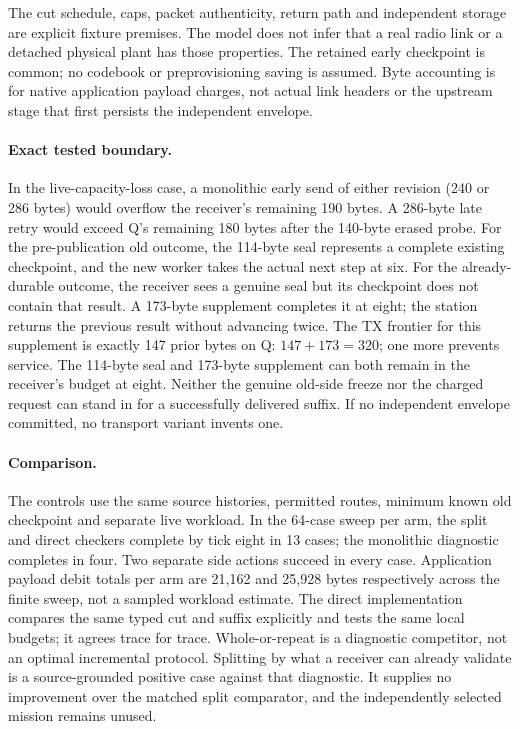 \documentclass{article}
\begin{document}
The cut schedule, caps, packet authenticity, return path and
independent storage are explicit fixture premises. The model does
not infer that a real radio link or a detached physical plant
has those properties. The retained early checkpoint is common; no
codebook or preprovisioning saving is assumed. Byte accounting is
for native application payload charges, not actual link headers or
the upstream stage that first persists the independent envelope.

\paragraph{Exact tested boundary.}
In the live-capacity-loss case, a monolithic early send of either
revision (240 or 286 bytes) would overflow the receiver's remaining
190 bytes. A 286-byte late retry would exceed Q's remaining
180 bytes after the 140-byte erased probe. For the pre-publication
old outcome, the 114-byte seal represents a complete existing
checkpoint, and the new worker takes the actual next step at six.
For the already-durable outcome, the receiver sees a genuine seal
but its checkpoint does not contain that result. A 173-byte
supplement completes it at eight; the station returns the previous
result without advancing twice. The TX frontier for this
supplement is exactly 147 prior bytes on Q: $147+173=320$; one
more prevents service. The 114-byte seal and 173-byte supplement
can both remain in the receiver's budget at eight. Neither
the genuine old-side freeze nor the charged request can stand in
for a successfully delivered suffix. If no independent envelope
committed, no transport variant invents one.

\paragraph{Comparison.}
The controls use the same source histories, permitted routes,
minimum known old checkpoint and separate live workload. In the 64-case sweep per arm, the
split and direct checkers complete by tick eight in 13 cases;
the monolithic diagnostic completes in four. Two separate
side actions succeed in every case. Application payload debit
totals per arm are 21,162 and 25,928 bytes respectively across
the finite sweep, not a sampled workload estimate.
The direct implementation compares the same typed cut and
suffix explicitly and tests the same local budgets; it agrees
trace for trace. Whole-or-repeat is a diagnostic competitor,
not an optimal incremental protocol. Splitting by what a
receiver can already validate is a source-grounded positive
case against that diagnostic. It supplies no improvement over
the matched split comparator, and the independently selected
mission remains unused.
\end{document}
